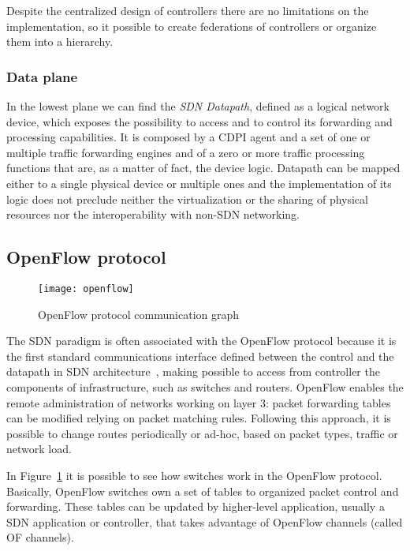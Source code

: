 Despite the centralized design of controllers there are no limitations on the
implementation, so it possible to create federations of controllers or organize
them into a hierarchy.

\subsubsection{Data plane}
In the lowest plane we can find the \emph{SDN Datapath}, defined as a logical
network device, which exposes the possibility to access and to control its
forwarding and processing capabilities. It is composed by a CDPI agent and a set
of one or multiple traffic forwarding engines and of a zero or more traffic
processing functions that are, as a matter of fact, the device logic. Datapath
can be mapped either to a single physical device or multiple ones and the
implementation of its logic does not preclude neither the virtualization or
the sharing of physical resources nor the interoperability with non-SDN
networking.

\subsection{OpenFlow protocol}
\begin{figure}[t]
  \centering
  \texttt{[image: openflow]}
  \caption{OpenFlow protocol communication graph}
  \label{chap:background:img:openflow_protocol}
\end{figure}

The SDN paradigm is often associated with the OpenFlow protocol because it is
the first standard communications interface defined between the control and the
datapath in SDN architecture~\cite{fundation2013software}, making possible to
access from controller the components of infrastructure, such as switches and
routers. OpenFlow enables the remote administration of networks working on 
layer 3: packet forwarding tables can be modified relying on packet matching 
rules. Following this approach, it is possible to change routes periodically or 
ad-hoc, based on packet types, traffic or network load.

In Figure~\ref{chap:background:img:openflow_protocol} it is possible to see
how switches work in the OpenFlow protocol. Basically, OpenFlow switches own a
set of tables to organized packet control and forwarding. These tables can be
updated by higher-level application, usually a SDN application or controller,
that takes advantage of OpenFlow channels (called OF channels). 

